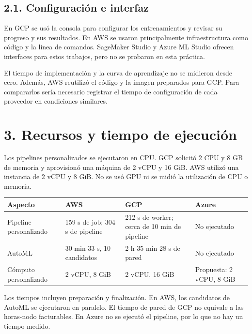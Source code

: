 \subsection{2.1. Configuración e interfaz}

En GCP se usó la consola para configurar los entrenamientos y revisar su progreso y sus resultados. En AWS se usaron principalmente infraestructura como código y la línea de comandos. SageMaker Studio y Azure ML Studio ofrecen interfaces para estos trabajos, pero no se probaron en esta práctica.

El tiempo de implementación y la curva de aprendizaje no se midieron desde cero. Además, AWS reutilizó el código y la imagen preparados para GCP. Para compararlos sería necesario registrar el tiempo de configuración de cada proveedor en condiciones similares.

\section{3. Recursos y tiempo de ejecución}

Los pipelines personalizados se ejecutaron en CPU. GCP solicitó 2 CPU y 8 GB de memoria y aprovisionó una máquina de 2 vCPU y 16 GiB. AWS utilizó una instancia de 2 vCPU y 8 GiB. No se usó GPU ni se midió la utilización de CPU o memoria.

\begin{fullwidth}\small
\setlength{\tabcolsep}{5pt}\renewcommand{\arraystretch}{1.2}
\begin{tabularx}{\linewidth}{@{}lXXX@{}}
\toprule
\textbf{Aspecto} & \textbf{AWS} & \textbf{GCP} & \textbf{Azure} \\
\midrule
Pipeline personalizado & 159 s de job; 304 s de pipeline & 212 s de worker; cerca de 10 min de pipeline & No ejecutado \\
AutoML & 30 min 33 s, 10 candidatos & 2 h 35 min 28 s de pared & No ejecutado \\
Cómputo personalizado & 2 vCPU, 8 GiB & 2 vCPU, 16 GiB & Propuesta: 2 vCPU, 8 GiB \\
\bottomrule
\end{tabularx}
\end{fullwidth}

Los tiempos incluyen preparación y finalización. En AWS, los candidatos de AutoML se ejecutaron en paralelo. El tiempo de pared de GCP no equivale a las horas-nodo facturables. En Azure no se ejecutó el pipeline, por lo que no hay un tiempo medido.

